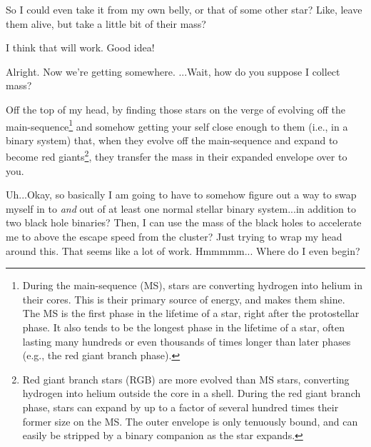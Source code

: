 \documentclass[main.tex]{subfiles}
\begin{document}
\par \Sterope So I could even take it from my own belly, or that of some other star?  Like, leave them alive, but take a little bit of their mass?

\par \Enrico I think that will work.  Good idea!

\par \Sterope Alright.  Now we're getting somewhere.  ...Wait, how do you suppose I collect mass?

\par \Enrico Off the top of my head, by finding those stars on the verge of evolving off the main-sequence\footnote{During the main-sequence (MS), stars are converting hydrogen into helium in their cores.  This is their primary source of energy, and makes them shine.  The MS is the first phase in the lifetime of a star, right after the protostellar phase.  It also tends to be the longest phase in the lifetime of a star, often lasting many hundreds or even thousands of times longer than later phases (e.g., the red giant branch phase).} and somehow getting your self close enough to them (i.e., in a binary system) that, when they evolve off the main-sequence and expand to become red giants\footnote{Red giant branch stars (RGB) are more evolved than MS stars, converting hydrogen into helium outside the core in a shell.  During the red giant branch phase, stars can expand by up to a factor of several hundred times their former size on the MS.  The outer envelope is only tenuously bound, and can easily be stripped by a binary companion as the star expands.}, they transfer the mass in their expanded envelope over to you.

\par \Sterope  Uh...Okay, so basically I am going to have to somehow figure out a way to swap myself in to \textit{and} out of at least one normal stellar binary system...in addition to two black hole binaries?  Then, I can use the mass of the black holes to accelerate me to above the escape speed from the cluster?  Just trying to wrap my head around this.  That seems like a lot of work.  Hmmmmm... Where do I even begin?
\end{document}
